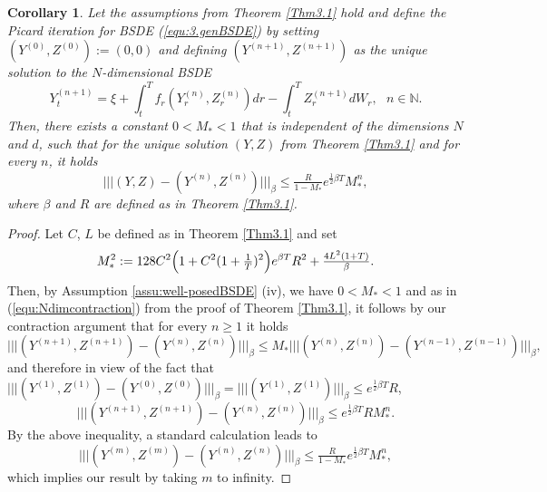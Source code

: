 \documentclass[10pt,a4paper]{article}
\theoremstyle{plain}
\newtheorem{Corollary}[Theorem]{Corollary}
\theoremstyle{definition}
\numberwithin{equation}{section}
\newcommand{\trinm}[1]{\vert\!\vert\!\vert #1 \vert\!\vert\!\vert}
\begin{document}
\begin{Corollary}
\label{Cor3.3}
Let the assumptions from Theorem \ref{Thm3.1} hold and define the Picard iteration for BSDE \textnormal{(\ref{equ:3.genBSDE})} by setting $(Y^{(0)},Z^{(0)}):= (0,0)$ and defining $(Y^{(n+1)},Z^{(n+1)})$ as the unique solution to the $N$-dimensional BSDE
\[
Y_{t}^{(n+1)} = \xi + \int_{t}^{T}f_{r}(Y_{r}^{(n)},Z_{r}^{(n)})dr - \int_{t}^{T}Z_{r}^{(n+1)}dW_{r},\ \ \ n \in \mathbb{N}.
\]
Then, there exists a constant $0<M_{*}< 1$ that is independent of the dimensions $N$ and $d$, such that for the unique solution $(Y,Z)$ from Theorem \ref{Thm3.1} and for every $n$, it holds
\begin{equation}
\label{NdimPicard}
\trinm{(Y,Z)-(Y^{(n)},Z^{(n)}) }_\beta  \leq \tfrac{R}{1-M_{*}}e^{\tfrac{1}{2}\beta T}M_{*}^{n},
\end{equation}
where $\beta$ and $R$ are defined as in Theorem \ref{Thm3.1}.
\end{Corollary}
\begin{proof}
    
Let $C$, $L$ be defined as in Theorem \ref{Thm3.1} and set
\[
M_{*}^{2} := 128C^{2}\Bigl(1+C^{2}(1+\tfrac{1}{T})^{2}\Bigr)e^{\beta T}R^{2} + \tfrac{4L^{2}(1+T)}{\beta}.
\]
Then, by Assumption \ref{assu:well-posedBSDE} (iv), we have $0<M_{*}<1$ and as in (\ref{equ:Ndimcontraction}) from the proof of Theorem \ref{Thm3.1}, it follows by our contraction argument that for every $n \geq 1$ it holds
\[
\trinm{(Y^{(n+1)},Z^{(n+1)}) - (Y^{(n)},Z^{(n)})}_\beta   \leq M_{*} \trinm{(Y^{(n)},Z^{(n)}) - (Y^{(n-1)},Z^{(n-1)})}_\beta ,
\]
and therefore in view of the fact that $\trinm{(Y^{(1)},Z^{(1)}) - (Y^{(0)},Z^{(0)})}_\beta = \trinm{ (Y^{(1)},Z^{(1)})}_\beta \leq e^{\tfrac{1}{2}\beta T}R$,
\[
\trinm{ (Y^{(n+1)},Z^{(n+1)}) - (Y^{(n)},Z^{(n)})}_\beta \leq e^{\tfrac{1}{2}\beta T}RM_{*}^{n}.
\]
By the above inequality, a standard calculation leads to 
$$
\trinm{ (Y^{(m)},Z^{(m)})-(Y^{(n)},Z^{(n)})}_\beta \le \tfrac{R}{1-M_{*}}e^{\tfrac{1}{2}\beta T}M_{*}^{n},
$$
which implies our result by taking $m$ to infinity.

\end{proof}
\end{document}
